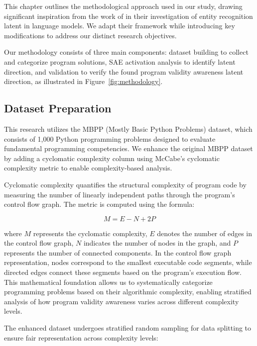 \documentclass[11pt]{article}
\begin{document}
This chapter outlines the methodological approach used in our study, drawing significant inspiration from the work of \citet{ferrando2024know} in their investigation of entity recognition latent in language models. We adapt their framework while introducing key modifications to address our distinct research objectives.

Our methodology consists of three main components: dataset building to collect and categorize program solutions, SAE activation analysis to identify latent direction, and validation to verify the found program validity awareness latent direction, as illustrated in Figure~\ref{fig:methodology}.

\subsection{Dataset Preparation}

This research utilizes the MBPP (Mostly Basic Python Problems) dataset, which consists of 1,000 Python programming problems designed to evaluate fundamental programming competencies. We enhance the original MBPP dataset by adding a cyclomatic complexity column using McCabe's cyclomatic complexity metric \citep{mccabe1976complexity} to enable complexity-based analysis.

Cyclomatic complexity quantifies the structural complexity of program code by measuring the number of linearly independent paths through the program's control flow graph. The metric is computed using the formula:

\begin{equation}
M = E - N + 2P
\end{equation}

where $M$ represents the cyclomatic complexity, $E$ denotes the number of edges in the control flow graph, $N$ indicates the number of nodes in the graph, and $P$ represents the number of connected components. In the control flow graph representation, nodes correspond to the smallest executable code segments, while directed edges connect these segments based on the program's execution flow. This mathematical foundation allows us to systematically categorize programming problems based on their algorithmic complexity, enabling stratified analysis of how program validity awareness varies across different complexity levels.

The enhanced dataset undergoes stratified random sampling for data splitting to ensure fair representation across complexity levels:
\end{document}
